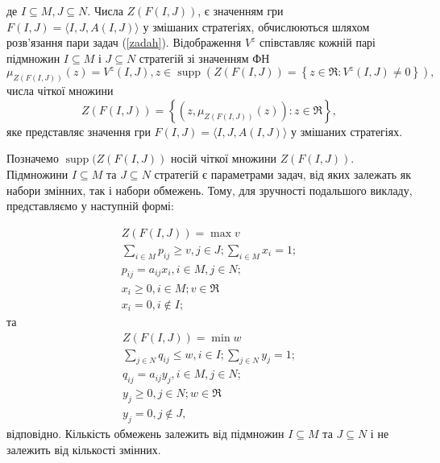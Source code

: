 \documentclass[14pt, a4paper, oneside]{extarticle}
\numberwithin{equation}{section}
\begin{document}
де $I \subseteq M, J \subseteq N$.
Числа $Z(F(I, J))$, є значенням гри $F(I, J)=\langle I, J, A(I, J)\rangle$ у змішаних стратегіях, обчислюються шляхом розв'язання пари задач (\ref{zadah}). Відображення $V^{z}$ співставляє кожній парі підмножин $I \subseteq M$ і $J \subseteq N$ стратегій зі значенням ФН
\begin{equation*}
\mu_{Z(F(I, J))}(z)=V^{z}(I, J), z \in \operatorname{supp}\left(Z(F(I, J))=\left\{z \in \Re: V^{z}(I, J) \neq 0\right\}\right),
\end{equation*}
числа чіткої множини
\begin{equation*}
Z(F(I, J))=\left\{\left(z, \mu_{Z(F(I, J))}(z)\right): z \in \Re\right\},
\end{equation*}
яке представляє значення гри $F(I, J)=\langle I, J, A(I, J)\rangle$ у змішаних стратегіях.

Позначемо $\operatorname{supp}(Z(F(I, J))$ носій чіткої множини $Z(F(I, J))$. Підмножини $I \subseteq M$ та $J \subseteq N$ стратегій є параметрами задач, від яких залежать як набори змінних, так і набори обмежень. Тому, для зручності подальшого викладу, представляємо у наступній формі:

\begin{equation*}
\begin{array}{r}
Z(F(I, J))=\max v \\
\sum_{i \in M} p_{i j} \geq v, j \in J ; \sum_{i \in M} x_{i}=1 ; \\
p_{i j} = a_{i j}x_{i}, i \in M, j \in N ; \\
x_{i} \geq 0, i \in M ; v \in \Re \\
x_{i}=0, i \notin I ;
\end{array}
\end{equation*}
та
\begin{equation*}
\begin{array}{r}
Z(F(I, J))=\min w \\
\sum_{j \in N} q_{i j} \leq w, i \in I ; \sum_{j \in N} y_{j}=1 ; \\
q_{i j} = a_{i j}y_{j}, i \in M, j \in N ;\\
y_{j} \geq 0, j \in N ; w \in \Re \\
y_{j}=0, j \notin J,
\end{array}
\end{equation*}
відповідно. Кількість обмежень залежить від підмножин $I \subseteq M$ та $J \subseteq N$ і не залежить від кількості змінних.
\end{document}

